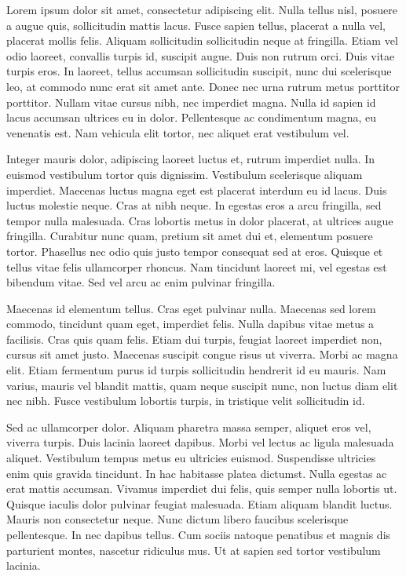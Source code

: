 Lorem ipsum dolor sit amet, consectetur adipiscing elit. Nulla tellus nisl, posuere a augue quis, sollicitudin mattis lacus. Fusce sapien tellus, placerat a nulla vel, placerat mollis felis. Aliquam sollicitudin sollicitudin neque at fringilla. Etiam vel odio laoreet, convallis turpis id, suscipit augue. Duis non rutrum orci. Duis vitae turpis eros. In laoreet, tellus accumsan sollicitudin suscipit, nunc dui scelerisque leo, at commodo nunc erat sit amet ante. Donec nec urna rutrum metus porttitor porttitor. Nullam vitae cursus nibh, nec imperdiet magna. Nulla id sapien id lacus accumsan ultrices eu in dolor. Pellentesque ac condimentum magna, eu venenatis est. Nam vehicula elit tortor, nec aliquet erat vestibulum vel.

Integer mauris dolor, adipiscing laoreet luctus et, rutrum imperdiet nulla. In euismod vestibulum tortor quis dignissim. Vestibulum scelerisque aliquam imperdiet. Maecenas luctus magna eget est placerat interdum eu id lacus. Duis luctus molestie neque. Cras at nibh neque. In egestas eros a arcu fringilla, sed tempor nulla malesuada. Cras lobortis metus in dolor placerat, at ultrices augue fringilla. Curabitur nunc quam, pretium sit amet dui et, elementum posuere tortor. Phasellus nec odio quis justo tempor consequat sed at eros. Quisque et tellus vitae felis ullamcorper rhoncus. Nam tincidunt laoreet mi, vel egestas est bibendum vitae. Sed vel arcu ac enim pulvinar fringilla.

Maecenas id elementum tellus. Cras eget pulvinar nulla. Maecenas sed lorem commodo, tincidunt quam eget, imperdiet felis. Nulla dapibus vitae metus a facilisis. Cras quis quam felis. Etiam dui turpis, feugiat laoreet imperdiet non, cursus sit amet justo. Maecenas suscipit congue risus ut viverra. Morbi ac magna elit. Etiam fermentum purus id turpis sollicitudin hendrerit id eu mauris. Nam varius, mauris vel blandit mattis, quam neque suscipit nunc, non luctus diam elit nec nibh. Fusce vestibulum lobortis turpis, in tristique velit sollicitudin id.

Sed ac ullamcorper dolor. Aliquam pharetra massa semper, aliquet eros vel, viverra turpis. Duis lacinia laoreet dapibus. Morbi vel lectus ac ligula malesuada aliquet. Vestibulum tempus metus eu ultricies euismod. Suspendisse ultricies enim quis gravida tincidunt. In hac habitasse platea dictumst. Nulla egestas ac erat mattis accumsan. Vivamus imperdiet dui felis, quis semper nulla lobortis ut. Quisque iaculis dolor pulvinar feugiat malesuada. Etiam aliquam blandit luctus. Mauris non consectetur neque. Nunc dictum libero faucibus scelerisque pellentesque. In nec dapibus tellus. Cum sociis natoque penatibus et magnis dis parturient montes, nascetur ridiculus mus. Ut at sapien sed tortor vestibulum lacinia.

